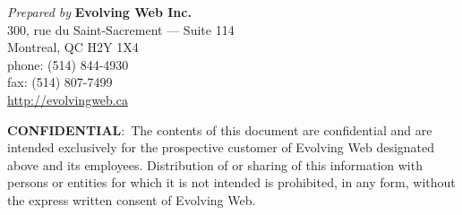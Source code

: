 \begin{titlingpage}
  \maketitle
  \vfill
\end{titlingpage}

\pagebreak

\emph{Prepared by} \textbf{Evolving Web Inc.} \\
300, rue du Saint-Sacrement --- Suite 114 \\
Montreal, QC H2Y 1X4 \\
phone: (514) 844-4930 \\
fax: (514) 807-7499 \\
\href{http://evolvingweb.ca}{http://evolvingweb.ca}

\vfill
\textbf{CONFIDENTIAL}:~The contents of this document are confidential
and are intended exclusively for the prospective customer of Evolving
Web designated above and its employees. Distribution of or sharing of
this information with persons or entities for which it is not intended
is prohibited, in any form, without the express written consent of
Evolving Web.
\pagebreak
